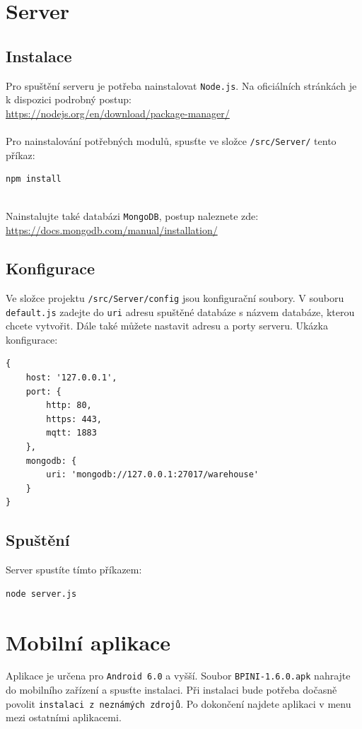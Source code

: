 \documentclass[12pt]{report}
\begin{document}
\section{Server}

\subsection{Instalace}
Pro spuštění serveru je potřeba nainstalovat \texttt{Node.js}. Na oficiálních stránkách je k dispozici podrobný postup: \\
\url{https://nodejs.org/en/download/package-manager/}
\\\\
Pro nainstalování potřebných modulů, spusťte ve složce \texttt{/src/Server/} tento příkaz:
\begin{verbatim}
npm install
\end{verbatim}
\ \\
Nainstalujte také databázi \texttt{MongoDB}, postup naleznete zde: \\
\url{https://docs.mongodb.com/manual/installation/}

\subsection{Konfigurace}
Ve složce projektu \texttt{/src/Server/config} jsou konfigurační soubory. 
V souboru \texttt{default.js} zadejte do \texttt{uri} adresu spuštěné databáze s názvem databáze, kterou chcete vytvořit.
Dále také můžete nastavit adresu a porty serveru. Ukázka konfigurace:
\begin{verbatim}
{
    host: '127.0.0.1',
    port: {
        http: 80,
        https: 443,
        mqtt: 1883
    },
    mongodb: {
        uri: 'mongodb://127.0.0.1:27017/warehouse'
    }
}
\end{verbatim}



\subsection{Spuštění}
Server spustíte tímto příkazem:
\begin{verbatim}
node server.js
\end{verbatim}


\section{Mobilní aplikace}
Aplikace je určena pro \texttt{Android 6.0} a vyšší.	
Soubor \texttt{BPINI-1.6.0.apk} nahrajte do mobilního zařízení a spusťte instalaci.
Při instalaci bude potřeba dočasně povolit \texttt{instalaci z neznámých zdrojů}.
Po dokončení najdete aplikaci v menu mezi ostatními aplikacemi.
\end{document}
